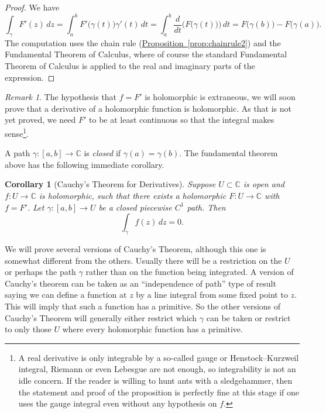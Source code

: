\documentclass[12pt,openany]{book}
\newcommand{\C}{{\mathbb{C}}}
\theoremstyle{plain}
\newtheorem{cor}[thm]{Corollary}
\theoremstyle{remark}
\newtheorem{remark}[thm]{Remark}
\theoremstyle{definition}
\theoremstyle{exercise}
\theoremstyle{example}
\newcommand{\propref}[1]{\hyperref[#1]{Proposition~\ref*{#1}}}
\begin{document}
\begin{proof}
We have
\begin{equation*}
\int_\gamma F'(z) \, dz
=
\int_a^b F'\bigl(\gamma(t)\bigr) \gamma'(t) \, dt 
=
\int_a^b \frac{d}{dt} \bigl( F\bigl(\gamma(t)\bigr) \bigr) \, dt 
=
F\bigl( \gamma(b) \bigr) - F\bigl( \gamma(a) \bigr) .
\end{equation*}
The computation uses the chain rule (\propref{prop:chainrule2})
and the Fundamental Theorem of Calculus, where of course the
standard Fundamental Theorem of Calculus is applied to the real and imaginary parts
of the expression.
\end{proof}

\begin{remark}
The hypothesis that $f=F'$ is holomorphic is extraneous,
we will soon prove that a derivative of a holomorphic function is
holomorphic.  As that is not yet proved, we need $F'$ to be at least
continuous so that the integral makes sense\footnote{%
A real derivative is only integrable
by a so-called gauge or Henstock--Kurzweil integral, Riemann or
even Lebesgue are not enough, so integrability is not an idle concern.
If the reader is willing to hunt ants with a sledgehammer, then
the statement and proof of the proposition is perfectly fine at this stage
if one uses the gauge integral even without any hypothesis on $f$.}.
\end{remark}

A path $\gamma \colon [a,b] \to \C$ is \emph{closed} if 
$\gamma(a) = \gamma(b)$.  The fundamental theorem above has the following
immediate corollary.

\begin{cor}[Cauchy's Theorem for Derivatives] \label{cor:cauchyforders}
Suppose $U \subset \C$ is open and $f \colon U \to \C$
is holomorphic, such that there exists
a holomorphic $F \colon U \to \C$ with $f = F'$.
Let $\gamma \colon [a,b] \to U$ be a closed piecewise $C^1$ path.
Then
\begin{equation*}
\int_\gamma f(z) \, dz = 0 .
\end{equation*}
\end{cor}

We will prove several versions of Cauchy's Theorem, although this one is
somewhat different from the others.  Usually there will be a restriction on
the $U$ or perhaps the path $\gamma$ rather
than on the function being integrated.
A version of Cauchy's theorem can be taken as an ``independence of path''
type of result saying we can define a function at $z$ by a line integral
from some fixed point to $z$.  This will imply that such a function has a
primitive.  So the other versions of Cauchy's Theorem will generally
either restrict which $\gamma$ can be taken or
restrict to only those $U$ where every holomorphic function has a primitive.
\end{document}
